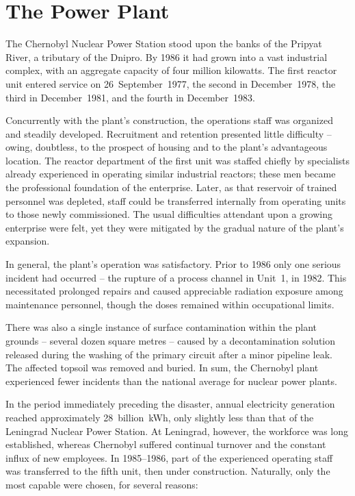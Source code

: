 \documentclass[openright]{bookest}
\begin{document}
\chapter{The Power Plant}

The Chernobyl Nuclear Power Station stood upon the banks of the Pripyat River, a tributary of the Dnipro. By 1986 it had grown into a vast industrial complex, with an aggregate capacity of four million kilowatts. The first reactor unit entered service on 26~September~1977, the second in December~1978, the third in December~1981, and the fourth in December~1983.

Concurrently with the plant's construction, the operations staff was organized and steadily developed. Recruitment and retention presented little difficulty -- owing, doubtless, to the prospect of housing and to the plant's advantageous location. The reactor department of the first unit was staffed chiefly by specialists already experienced in operating similar industrial reactors; these men became the professional foundation of the enterprise. Later, as that reservoir of trained personnel was depleted, staff could be transferred internally from operating units to those newly commissioned. The usual difficulties attendant upon a growing enterprise were felt, yet they were mitigated by the gradual nature of the plant's expansion.

In general, the plant's operation was satisfactory. Prior to 1986 only one serious incident had occurred -- the rupture of a process channel in Unit~1, in 1982. This necessitated prolonged repairs and caused appreciable radiation exposure among maintenance personnel, though the doses remained within occupational limits.

There was also a single instance of surface contamination within the plant grounds -- several dozen square metres -- caused by a decontamination solution released during the washing of the primary circuit after a minor pipeline leak. The affected topsoil was removed and buried. In sum, the Chernobyl plant experienced fewer incidents than the national average for nuclear power plants.

In the period immediately preceding the disaster, annual electricity generation reached approximately \num{28}~billion~\unit{\kWh}, only slightly less than that of the Leningrad Nuclear Power Station. At Leningrad, however, the workforce was long established, whereas Chernobyl suffered continual turnover and the constant influx of new employees. In 1985--1986, part of the experienced operating staff was transferred to the fifth unit, then under construction. Naturally, only the most capable were chosen, for several reasons:
\end{document}

